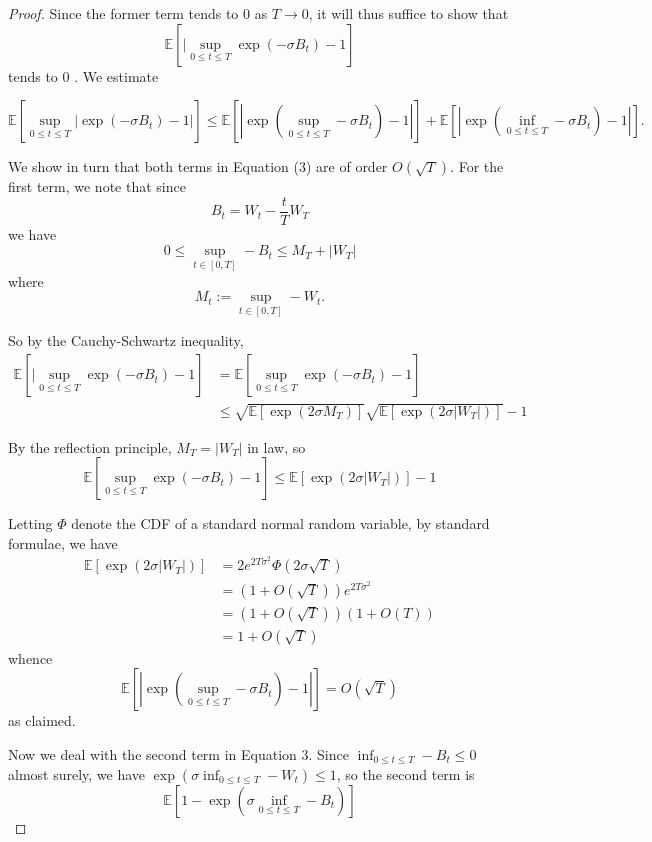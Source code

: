 \documentclass{article}
\theoremstyle{definition}
\theoremstyle{definition}
\begin{document}
\begin{proof}
Since the former term tends to 0 as $T \rightarrow 0$, it will thus suffice to show that
$$
\mathbb{E}\left[\mid \sup _{0 \leq t \leq T} \exp \left(-\sigma B_{t}\right)-1\right]
$$
tends to 0 . We estimate

\begin{equation}
\mathbb{E}\left[\sup _{0 \leq t \leq T}\left|\exp \left(-\sigma B_{t}\right)-1\right|\right] \leq \mathbb{E}\left[\left|\exp \left(\sup _{0 \leq t \leq T}-\sigma B_{t}\right)-1\right|\right]+\mathbb{E}\left[\left|\exp \left(\inf _{0 \leq t \leq T}-\sigma B_{t}\right)-1\right|\right] .
\end{equation}


We show in turn that both terms in Equation (3) are of order $O(\sqrt{T})$. For the first term, we note that since
$$
B_{t}=W_{t}-\frac{t}{T} W_{T}
$$
we have
$$
0 \leq \sup _{t \in[0, T]}-B_{t} \leq M_{T}+\left|W_{T}\right|
$$
where
$$
M_{t}:=\sup _{t \in[0, T]}-W_{t} .
$$

So by the Cauchy-Schwartz inequality,
$$
\begin{aligned}
\mathbb{E}\left[\mid \sup _{0 \leq t \leq T} \exp \left(-\sigma B_{t}\right)-1\right] & =\mathbb{E}\left[\sup _{0 \leq t \leq T} \exp \left(-\sigma B_{t}\right)-1\right] \\
& \leq \sqrt{\mathbb{E}\left[\exp \left(2 \sigma M_{T}\right)\right]} \sqrt{\mathbb{E}\left[\exp \left(2 \sigma\left|W_{T}\right|\right)\right]}-1
\end{aligned}
$$

By the reflection principle, $M_{T}=\left|W_{T}\right|$ in law, so
$$
\mathbb{E}\left[\sup _{0 \leq t \leq T} \exp \left(-\sigma B_{t}\right)-1\right] \leq \mathbb{E}\left[\exp \left(2 \sigma\left|W_{T}\right|\right)\right]-1
$$

Letting $\Phi$ denote the CDF of a standard normal random variable, by standard formulae, we have
$$
\begin{aligned}
\mathbb{E}\left[\exp \left(2 \sigma\left|W_{T}\right|\right)\right] & =2 e^{2 T \sigma^{2}} \Phi(2 \sigma \sqrt{T}) \\
& =(1+O(\sqrt{T})) e^{2 T \sigma^{2}} \\
& =(1+O(\sqrt{T}))(1+O(T)) \\
& =1+O(\sqrt{T})
\end{aligned}
$$
whence
$$
\mathbb{E}\left[\left|\exp \left(\sup _{0 \leq t \leq T}-\sigma B_{t}\right)-1\right|\right]=O(\sqrt{T})
$$
as claimed.

Now we deal with the second term in Equation 3. Since $\inf _{0 \leq t \leq T}-B_{t} \leq 0$ almost surely, we have $\exp \left(\sigma \inf _{0 \leq t \leq T}-W_{t}\right) \leq 1$, so the second term is
$$
\mathbb{E}\left[1-\exp \left(\sigma \inf _{0 \leq t \leq T}-B_{t}\right)\right]
$$


\end{proof}
\end{document}
